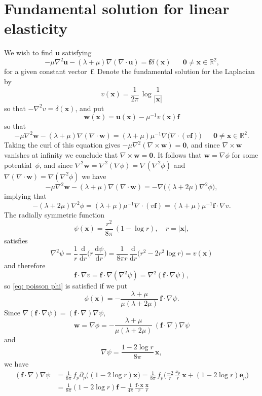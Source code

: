 \documentclass[a4paper,12pt]{article}
\newcommand{\bs}[1]{\boldsymbol{#1}}
\newcommand{\ud}{\mathrm{d}}
\begin{document}
\appendix
\section{Fundamental solution for linear elasticity}
We wish to find $\bs{u}$ satisfying
\begin{equation}\label{eq: elasticity point force}
-\mu\nabla^2\bs{u}-(\lambda+\mu)\nabla(\nabla\cdot\bs{u})=\bs{f}\delta(\bs{x})
\quad\text{ $\bs{0}\ne\bs{x}\in\mathbb{R}^2$,}
\end{equation}
for a given constant vector~$\bs{f}$.  Denote the fundamental solution for the
Laplacian by
\[
v(\bs{x})=\frac{1}{2\pi}\,\log\frac{1}{|\bs{x}|}
\]
so that $-\nabla^2v=\delta(\bs{x})$, and put
\[
\bs{w}(\bs{x})=\bs{u}(\bs{x})-\mu^{-1}v(\bs{x})\bs{f}
\]
so that
\[
-\mu\nabla^2\bs{w}-(\lambda+\mu)\nabla(\nabla\cdot\bs{w})
    =(\lambda+\mu)\mu^{-1}\nabla\bigl(\nabla\cdot(v\bs{f})\bigr)
\quad\text{ $\bs{0}\ne\bs{x}\in\mathbb{R}^2$.}
\]
Taking the curl of this equation gives
$-\mu\nabla^2(\nabla\times\bs{w})=\bs{0}$, and since $\nabla\times\bs{w}$
vanishes at infinity we conclude that $\nabla\times\bs{w}=\bs{0}$.  It follows
that $\bs{w}=\nabla\phi$ for some potential~$\phi$, and since
$\nabla^2\bs{w}=\nabla^2(\nabla\phi)=\nabla(\nabla^2\phi)$ and
$\nabla(\nabla\cdot\bs{w})=\nabla(\nabla^2\phi)$ we have
\[
-\mu\nabla^2\bs{w}-(\lambda+\mu)\nabla(\nabla\cdot\bs{w})
    =-\nabla\bigl((\lambda+2\mu)\nabla^2\phi\bigr),
\]
implying that
\begin{equation}\label{eq: poisson phi}
-(\lambda+2\mu)\nabla^2\phi=(\lambda+\mu)\mu^{-1}\nabla\cdot(v\bs{f})
    =(\lambda+\mu)\mu^{-1}\bs{f}\cdot\nabla v.
\end{equation}
The radially symmetric function
\[
\psi(\bs{x})=\frac{r^2}{8\pi}\,(1-\log r),\quad r=|\bs{x}|,
\]
satisfies
\[
\nabla^2\psi=\frac{1}{r}\,\frac{\ud}{\ud r}
    \biggl(r\,\frac{\ud\psi}{\ud r}\biggr)
    =\frac{1}{8\pi r}\,\frac{\ud}{\ud r}\bigl(r^2-2r^2\log r\bigr)
    =v(\bs{x})
\]
and therefore
\[
\bs{f}\cdot\nabla v=\bs{f}\cdot\nabla(\nabla^2\psi)
    =\nabla^2(\bs{f}\cdot\nabla\psi),
\]
so \eqref{eq: poisson phi} is satisfied if we put
\[
\phi(\bs{x})=-\frac{\lambda+\mu}{\mu(\lambda+2\mu)}\,\bs{f}\cdot\nabla\psi.
\]
Since $\nabla(\bs{f}\cdot\nabla\psi)=(\bs{f}\cdot\nabla)\nabla\psi$,
\[
\bs{w}=\nabla\phi=-\frac{\lambda+\mu}{\mu(\lambda+2\mu)}\,
    (\bs{f}\cdot\nabla)\nabla\psi
\]
and
\[
\nabla\psi=\frac{1-2\log r}{8\pi}\,\bs{x},
\]
we have
\begin{align*}
(\bs{f}\cdot\nabla)\nabla\psi&=\frac{1}{8\pi}\,f_p\partial_p
    \bigl((1-2\log r)\bs{x}\bigr)
    =\frac{1}{8\pi}\,f_p\biggl(\frac{-2}{r}\,\frac{x_p}{r}\,\bs{x}
    +(1-2\log r)\bs{e}_p\biggr)\\
    &=\frac{1}{8\pi}(1-2\log r)\bs{f}-\frac{1}{4\pi}\,
        \frac{\bs{f}\cdot\bs{x}}{r}\,\frac{\bs{x}}{r}
\end{align*}
\end{document}
